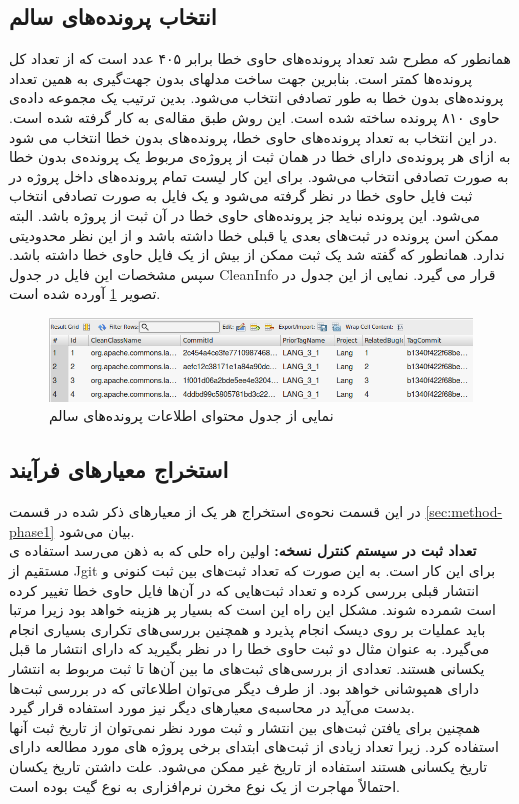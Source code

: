 \subsection{انتخاب پرونده‌های سالم}
همانطور که مطرح شد تعداد پرونده‌های حاوی خطا برابر ۴۰۵ عدد است که از تعداد کل پرونده‌ها کمتر است. بنابرین جهت ساخت مدلهای بدون جهت‌گیری به همین تعداد پرونده‌های بدون خطا به طور تصادفی انتخاب می‌شود. بدین ترتیب یک مجموعه داده‌ی  حاوی ۸۱۰ پرونده ساخته شده است. این روش طبق مقاله‌ی \cite{johannessen2008data} به کار گرفته شده است. در این انتخاب به تعداد پرونده‌های حاوی خطا، پرونده‌های بدون خطا انتخاب می شود. \\به ازای هر پرونده‌ی دارای خطا در همان ثبت از پروژه‌ی مربوط یک پرونده‌ی بدون خطا به صورت تصادفی انتخاب می‌شود. برای این کار لیست تمام پرونده‌های داخل پروژه در ثبت فایل حاوی خطا در نظر گرفته می‌شود و یک فایل به صورت تصادفی انتخاب می‌شود. این پرونده نباید جز پرونده‌های حاوی خطا در آن ثبت از  پروژه باشد.  البته ممکن اسن پرونده در ثبت‌های بعدی یا قبلی خطا داشته باشد و از این نظر محدودیتی ندارد. همانطور که گفته شد یک ثبت ممکن از بیش از یک فایل حاوی خطا داشته باشد. سپس مشخصات این فایل در جدول CleanInfo قرار می گیرد. نمایی از این جدول در تصویر \ref{fig:clean-info} آورده شده است.
\begin{figure}[H]
	\centering
	\includegraphics[width=1\textwidth]{img/case_study/clean-info.png}
	\caption{نمایی از جدول محتوای اطلاعات پرونده‌های سالم}
	\label{fig:clean-info}
\end{figure}



\subsection{ استخراج معیارهای فرآیند}
در  این قسمت نحوه‌ی استخراج هر یک از معیارهای ذکر شده در قسمت \ref{sec:method-phase1} بیان می‌شود. \\
\textbf{‫تعداد ثبت در سیستم کنترل نسخه‬:}
اولین راه حلی که به ذهن می‌رسد استفاده ی مستقیم از Jgit برای این کار است.  به این صورت که تعداد ثبت‌های بین ثبت کنونی و انتشار قبلی  بررسی کرده و تعداد  ثبت‌هایی که در آن‌ها فایل حاوی خطا تغییر کرده است شمرده شوند. مشکل این راه این است که بسیار پر هزینه  خواهد بود زیرا مرتبا باید عملیات  بر روی دیسک انجام پذیرد و همچنین بررسی‌های تکراری بسیاری انجام می‌گیرد. به عنوان مثال دو ثبت حاوی خطا را در نظر بگیرید که دارای انتشار ما قبل یکسانی هستند. تعدادی از بررسی‌های ثبت‌های ما بین آن‌ها تا ثبت مربوط به انتشار دارای همپوشانی خواهد بود. از طرف دیگر می‌توان اطلاعاتی که در بررسی ثبت‌ها بدست می‌آید در محاسبه‌ی معیارهای دیگر نیز مورد استفاده قرار گیرد.\\
همچنین برای یافتن ثبت‌های بین انتشار و ثبت مورد نظر نمی‌توان از تاریخ ثبت آنها استفاده کرد. زیرا تعداد زیادی از ثبت‌های ابتدای  برخی پروژه ‌های مورد مطالعه دارای تاریخ یکسانی هستند استفاده از تاریخ غیر ممکن می‌شود. علت داشتن تاریخ یکسان احتمالاً مهاجرت از یک نوع مخرن نرم‌افزاری به نوع گیت بوده است. \\

